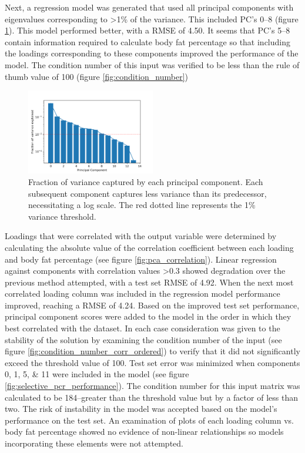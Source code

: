 \documentclass{IEEEtran}
\begin{document}
Next, a regression model was generated that used all principal components with eigenvalues corresponding to \textgreater1\% of the variance. This included PC's \numrange{0}{8} (figure \ref{fig:scaled_eigen}). This model performed better, with a RMSE of \num{4.50}. It seems that PC's \numrange{5}{8} contain information required to calculate body fat percentage so that including the loadings corresponding to these components improved the performance of the model. The condition number of this input was verified to be less than the rule of thumb value of 100 (figure \ref{fig:condition_number})

\begin{centering}
\begin{figure}
\centering
\begin{center}
	\includegraphics[width=0.5\textwidth]{fractional_variance_explained}
	\caption{Fraction of variance captured by each principal component. Each subsequent component captures less variance than its predecessor, necessitating a log scale. The red dotted line represents the 1\% variance threshold.\label{fig:scaled_eigen}}
\end{center}
\end{figure}
\end{centering}

Loadings that were correlated with the output variable were determined by calculating the absolute value of the correlation coefficient between each loading and body fat percentage (see figure \ref{fig:pca_correlation}). Linear regression against components with correlation values \textgreater0.3 showed degradation over the previous method attempted, with a test set RMSE of \num{4.92}. When the next most correlated loading column was included in the regression model performance improved, reaching a RMSE of \num{4.24}. Based on the improved test set performance, principal component scores were added to the model in the order in which they best correlated with the dataset. In each case consideration was given to the stability of the solution by examining the condition number of the input (see figure \ref{fig:condition_number_corr_ordered}) to verify that it did not significantly exceed the threshold value of 100. Test set error was minimized when components \numlist{0;1;5;11} were included in the model (see figure \ref{fig:selective_pcr_performance}). The condition number for this input matrix was calculated to be \num{184}--greater than the threshold value but by a factor of less than two. The risk of instability in the model was accepted based on the model's performance on the test set. An examination of plots of each loading column vs. body fat percentage showed no evidence of non-linear relationships so models incorporating these elements were not attempted.
\end{document}
